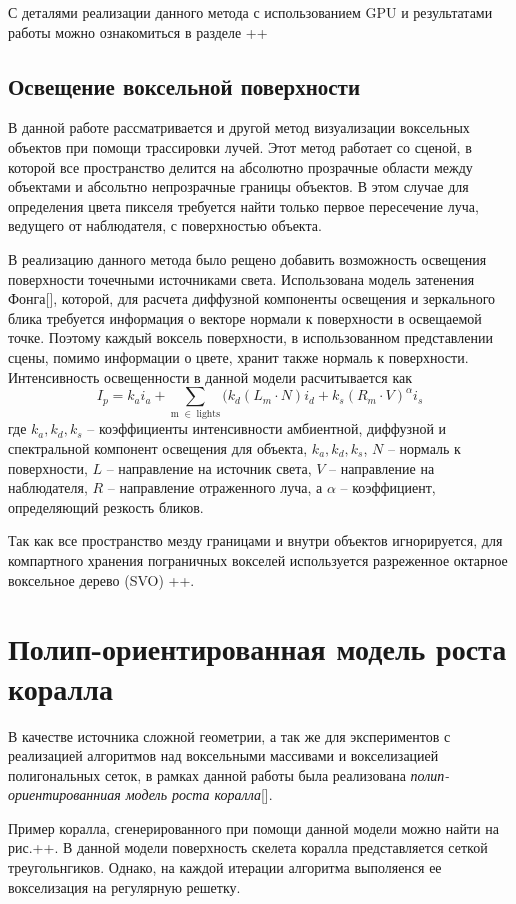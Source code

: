 С деталями реализации данного метода с использованием GPU и результатами работы можно ознакомиться в разделе ++

\subsection{Освещение воксельной поверхности}

В данной работе рассматривается и другой метод визуализации воксельных объектов при помощи трассировки лучей. Этот метод работает со сценой, в которой все пространство делится на абсолютно прозрачные области между объектами и абсольтно непрозрачные границы объектов. В этом случае для определения цвета пикселя требуется найти только первое пересечение луча, ведущего от наблюдателя, с поверхностью объекта. 

В реализацию данного метода было рещено добавить возможность освещения поверхности точечными источниками света. Использована модель затенения Фонга[], которой, для расчета диффузной компоненты освещения и зеркального блика требуется информация о векторе нормали к поверхности в освещаемой точке. Поэтому каждый воксель поверхности, в использованном представлении сцены, помимо информации о цвете, хранит также нормаль к поверхности. Интенсивность освещенности в данной модели расчитывается как $$ I_p = k_a i_a + \sum_\mathrm{m \; \in \; lights} (k_d (L_m \cdot N) i_d + k_s (R_m \cdot V)^{\alpha}i_s $$
где  $k_a, k_d, k_s$ -- коэффициенты интенсивности амбиентной, диффузной и спектральной компонент освещения для объекта, $k_a, k_d, k_s$, $N$ -- нормаль к поверхности, $L$ -- направление на источник света, $V$ -- направление на наблюдателя, $R$ -- направление отраженного луча, а $\alpha$ -- коэффициент, определяющий резкость бликов.

Так как все пространство мезду границами и внутри объектов игнорируется, для компартного хранения пограничных вокселей используется разреженное октарное воксельное дерево (SVO) ++.

\section{Полип-ориентированная модель роста коралла}
В качестве источника сложной геометрии, а так же для экспериментов с реализацией алгоритмов над воксельными массивами и вокселизацией полигональных сеток, в рамках данной работы была реализована \emph{полип-ориентированниая модель роста коралла}[]. 

Пример коралла, сгенерированного при помощи данной модели можно найти на рис.++. В данной модели поверхность скелета коралла представляется сеткой треугольнгиков. Однако, на каждой итерации алгоритма выполяенся ее вокселизация на регулярную решетку.

